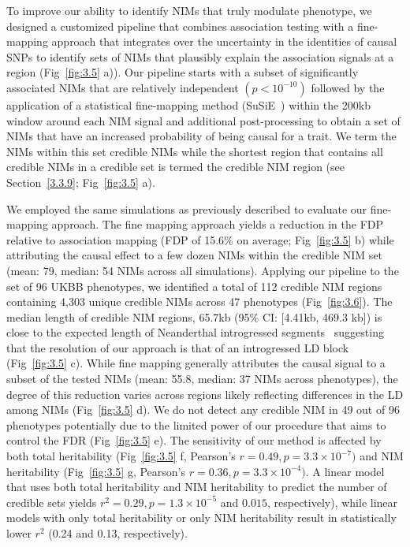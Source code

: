 To improve our ability to identify NIMs that truly modulate phenotype, we designed a customized pipeline that combines association testing with a fine-mapping approach that integrates over the uncertainty in the identities of causal SNPs to identify sets of NIMs that plausibly explain the association signals at a region (Fig~\ref{fig:3.5} a)). Our pipeline starts with a subset of significantly associated NIMs that are relatively independent $(p < 10^{-10})$ followed by the application of a statistical fine-mapping method (SuSiE~\cite{wang2020simple}) within the 200kb window around each NIM signal and additional post-processing to obtain a set of NIMs that have an increased probability of being causal for a trait. We term the NIMs within this set credible NIMs while the shortest region that contains all credible NIMs in a credible set is termed the credible NIM region (see Section~\ref{3.3.9}; Fig~\ref{fig:3.5} a). 

We employed the same simulations as previously described to evaluate our fine-mapping approach. The fine mapping approach yields a reduction in the FDP relative to association mapping (FDP of 15.6\% on average; Fig~\ref{fig:3.5} b) while attributing the causal effect to a few dozen NIMs within the credible NIM set (mean: 79, median: 54 NIMs across all simulations). Applying our pipeline to the set of 96 UKBB phenotypes, we identified a total of 112 credible NIM regions containing 4,303 unique credible NIMs across 47 phenotypes (Fig~\ref{fig:3.6}). The median length of credible NIM regions, 65.7kb (95\% CI: [4.41kb, 469.3 kb]) is close to the expected length of Neanderthal introgressed segments~\cite{skov2020nature} suggesting that the resolution of our approach is that of an introgressed LD block (Fig~\ref{fig:3.5} c). While fine mapping generally attributes the causal signal to a subset of the tested NIMs (mean: 55.8, median: 37 NIMs across phenotypes), the degree of this reduction varies across regions likely reflecting differences in the LD among NIMs (Fig~\ref{fig:3.5} d). We do not detect any credible NIM in 49 out of 96 phenotypes potentially due to the limited power of our procedure that aims to control the FDR (Fig~\ref{fig:3.5} e). The sensitivity of our method is affected by both total heritability (Fig~\ref{fig:3.5} f, Pearson’s $r = 0.49 , p = 3.3\times 10^{-7})$  and NIM heritability (Fig~\ref{fig:3.5} g, Pearson’s $r = 0.36, p = 3.3\times10^{-4})$. A linear model that uses both total heritability and NIM heritability to predict the number of credible sets yields $r^2 = 0.29, p = 1.3\times10^{-5}$ and $0.015$, respectively), while linear models with only total heritability or only NIM heritability result in statistically lower $r^2$ (0.24 and 0.13, respectively).

